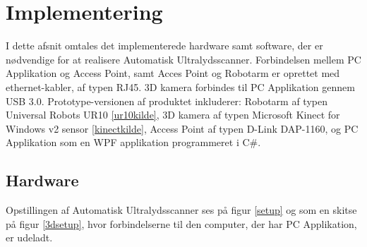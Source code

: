 \section{Implementering}
I dette afsnit omtales det implementerede hardware samt software, der er nødvendige for at realisere Automatisk Ultralydsscanner. Forbindelsen mellem PC Applikation og Access Point, samt Acces Point og Robotarm er oprettet med ethernet-kabler, af typen RJ45. 3D kamera forbindes til PC Applikation gennem USB 3.0. 
Prototype-versionen af produktet inkluderer:
Robotarm af typen Universal Robots UR10 \ref{ur10kilde}, 3D kamera af typen Microsoft Kinect for Windows v2 sensor \ref{kinectkilde}, Access Point af typen D-Link DAP-1160, og PC Applikation som en WPF applikation programmeret i C\#.
\subsection{Hardware}
Opstillingen af Automatisk Ultralydsscanner ses på figur \ref{setup} og som en skitse på figur \ref{3dsetup}, hvor forbindelserne til den computer, der har PC Applikation, er udeladt. 

